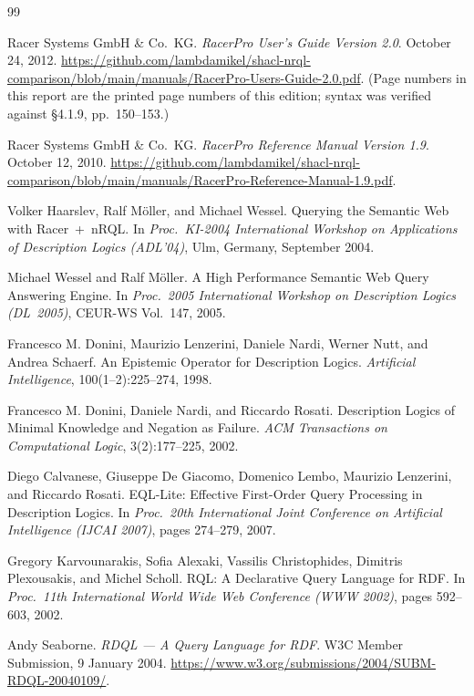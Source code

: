 \documentclass[11pt,letterpaper]{article}
\theoremstyle{definition}
\newcommand{\nrql}{nRQL}
\begin{document}
\begin{thebibliography}{99}

Racer Systems GmbH \& Co.\ KG. \emph{RacerPro User's Guide Version 2.0}. October 24, 2012. \url{https://github.com/lambdamikel/shacl-nrql-comparison/blob/main/manuals/RacerPro-Users-Guide-2.0.pdf}. (Page numbers in this report are the printed page numbers of this edition; syntax was verified against \S4.1.9, pp.~150--153.)

Racer Systems GmbH \& Co.\ KG. \emph{RacerPro Reference Manual Version 1.9}. October 12, 2010. \url{https://github.com/lambdamikel/shacl-nrql-comparison/blob/main/manuals/RacerPro-Reference-Manual-1.9.pdf}.

Volker Haarslev, Ralf M\"oller, and Michael Wessel. Querying the Semantic Web with Racer~+~\nrql{}. In \emph{Proc.\ KI-2004 International Workshop on Applications of Description Logics (ADL'04)}, Ulm, Germany, September 2004.

Michael Wessel and Ralf M\"oller. A High Performance Semantic Web Query Answering Engine. In \emph{Proc.\ 2005 International Workshop on Description Logics (DL~2005)}, CEUR-WS Vol.~147, 2005.

Francesco M. Donini, Maurizio Lenzerini, Daniele Nardi, Werner Nutt, and Andrea Schaerf. An Epistemic Operator for Description Logics. \emph{Artificial Intelligence}, 100(1--2):225--274, 1998.

Francesco M. Donini, Daniele Nardi, and Riccardo Rosati. Description Logics of Minimal Knowledge and Negation as Failure. \emph{ACM Transactions on Computational Logic}, 3(2):177--225, 2002.

Diego Calvanese, Giuseppe De Giacomo, Domenico Lembo, Maurizio Lenzerini, and Riccardo Rosati. EQL-Lite: Effective First-Order Query Processing in Description Logics. In \emph{Proc.\ 20th International Joint Conference on Artificial Intelligence (IJCAI 2007)}, pages 274--279, 2007.

Gregory Karvounarakis, Sofia Alexaki, Vassilis Christophides, Dimitris Plexousakis, and Michel Scholl. RQL: A Declarative Query Language for RDF. In \emph{Proc.\ 11th International World Wide Web Conference (WWW 2002)}, pages 592--603, 2002.

Andy Seaborne. \emph{RDQL --- A Query Language for RDF}. W3C Member Submission, 9 January 2004. \url{https://www.w3.org/submissions/2004/SUBM-RDQL-20040109/}.


\end{thebibliography}
\end{document}
